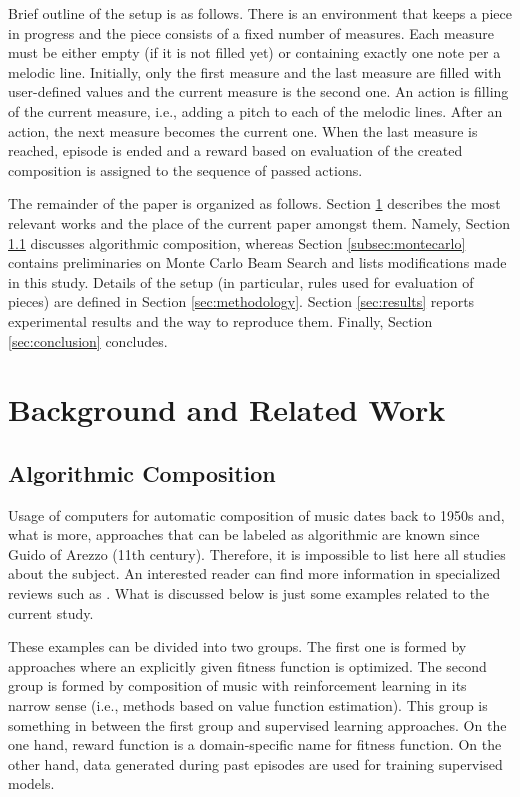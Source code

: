 \documentclass{article}
\begin{document}
Brief outline of the setup is as follows. There is an environment that keeps a piece in progress and the piece consists of a fixed number of measures. Each measure must be either empty (if it is not filled yet) or containing exactly one note per a melodic line. Initially, only the first measure and the last measure are filled with user-defined values and the current measure is the second one. An action is filling of the current measure, i.e., adding a pitch to each of the melodic lines. After an action, the next measure becomes the current one. When the last measure is reached, episode is ended and a reward based on evaluation of the created composition is assigned to the sequence of passed actions.

The remainder of the paper is organized as follows. Section \ref{sec:literature} describes the most relevant works and the place of the current paper amongst them. Namely, Section \ref{subsec:composition} discusses algorithmic composition, whereas Section \ref{subsec:montecarlo} contains preliminaries on Monte Carlo Beam Search and lists modifications made in this study. Details of the setup (in particular, rules used for evaluation of pieces) are defined in Section \ref{sec:methodology}. Section \ref{sec:results} reports experimental results and the way to reproduce them. Finally, Section \ref{sec:conclusion} concludes.


\section{Background and Related Work}
\label{sec:literature}

\subsection{Algorithmic Composition}
\label{subsec:composition}

Usage of computers for automatic composition of music dates back to 1950s and, what is more, approaches that can be labeled as algorithmic are known since Guido of Arezzo (11th century). Therefore, it is impossible to list here all studies about the subject. An interested reader can find more information in specialized reviews such as \cite{fernandez2013ai}. What is discussed below is just some examples related to the current study.

These examples can be divided into two groups. The first one is formed by approaches where an explicitly given fitness function is optimized. The second group is formed by composition of music with reinforcement learning in its narrow sense (i.e., methods based on value function estimation). This group is something in between the first group and supervised learning approaches. On the one hand, reward function is a domain-specific name for fitness function. On the other hand, data generated during past episodes are used for training supervised models.
\end{document}
